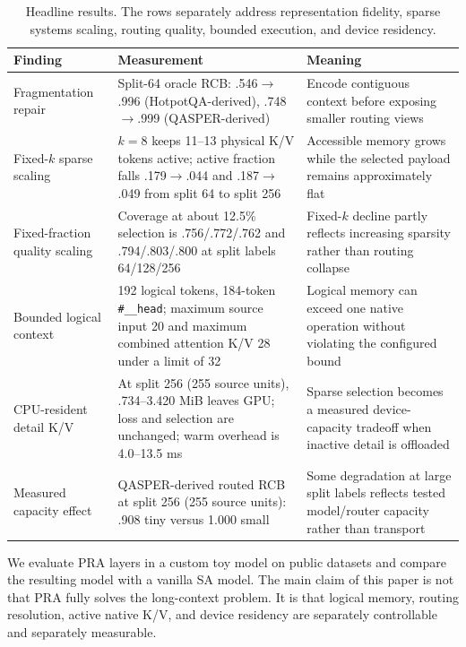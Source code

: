 \documentclass[11pt]{article}
\begin{document}
\begin{table}[H]
\centering
\footnotesize
\caption{Headline results. The rows separately address representation fidelity,
sparse systems scaling, routing quality, bounded execution, and device residency.}
\label{tab:headline}
\begin{tabularx}{\textwidth}{P{0.22\textwidth}P{0.31\textwidth}Y}
\toprule
Finding & Measurement & Meaning \\
\midrule
Fragmentation repair & Split-64 oracle RCB: .546$\rightarrow$.996
(HotpotQA-derived), .748$\rightarrow$.999 (QASPER-derived) & Encode contiguous context
before exposing smaller routing views \\
Fixed-$k$ sparse scaling &
  $k=8$ keeps 11--13 physical K/V tokens active; active fraction
falls .179$\rightarrow$.044 and .187$\rightarrow$.049 from split 64 to split 256 &
  Accessible
memory grows while the selected payload remains approximately flat \\
Fixed-fraction quality scaling & Coverage at about 12.5\% selection is
.756/.772/.762 and .794/.803/.800 at split labels 64/128/256 &
  Fixed-$k$ decline partly reflects
increasing sparsity rather than routing collapse \\
Bounded logical context &
  192 logical tokens, 184-token \texttt{\#\_\_head}; maximum source
input 20 and maximum combined attention K/V 28 under a limit of 32 &
  Logical memory can exceed one native
operation without violating the configured bound \\
CPU-resident detail K/V &
  At split 256 (255 source units), .734--3.420 MiB leaves GPU; loss and selection are
unchanged; warm overhead is 4.0--13.5 ms &
  Sparse selection becomes a measured device-capacity
tradeoff when inactive detail is offloaded \\
Measured capacity effect &
  QASPER-derived routed RCB at split 256 (255 source units): .908 tiny versus 1.000
small &
  Some degradation at large split labels reflects tested model/router capacity rather
  than transport \\
\bottomrule
\end{tabularx}
\end{table}

We evaluate PRA layers in a custom toy model on public datasets and compare the resulting
model with a vanilla SA model.
The main claim of this paper is not that PRA fully solves the long-context problem.
It is that logical memory, routing resolution, active native K/V,
and device residency are separately controllable and separately measurable.
\end{document}
